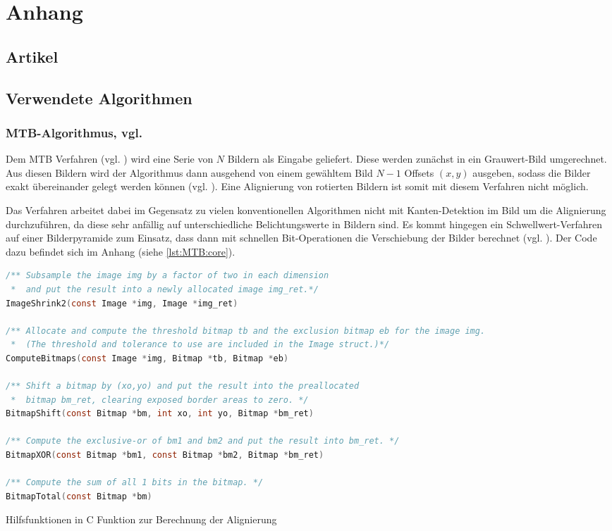 \chapter{Anhang}
\section{Artikel \cite{paper}}
 
\section{Verwendete Algorithmen}

\subsection{MTB-Algorithmus, vgl. \cite[S.9 f]{Ward03fast}}
\label{subsec:MTB}
Dem \gls{MTB} Verfahren (vgl. \cite{Ward03fast}) wird eine Serie von $N$ Bildern als Eingabe geliefert. Diese werden zunächst in ein Grauwert-Bild umgerechnet. Aus diesen Bildern wird der Algorithmus dann ausgehend von einem gewähltem Bild $N-1$ Offsets $(x,y)$ ausgeben, sodass die Bilder exakt übereinander gelegt werden können (vgl. \cite[S. 123f]{Reinhard}). Eine Alignierung von rotierten Bildern ist somit mit diesem Verfahren nicht möglich. 

Das Verfahren arbeitet dabei im Gegensatz zu vielen konventionellen Algorithmen nicht mit Kanten-Detektion im Bild um die Alignierung durchzuführen, da diese sehr anfällig auf unterschiedliche Belichtungswerte in Bildern sind. Es kommt hingegen ein Schwellwert-Verfahren auf einer Bilderpyramide zum Einsatz, dass dann mit schnellen Bit-Operationen die Verschiebung der Bilder berechnet (vgl. \cite{Ward03fast}). Der Code dazu befindet sich im Anhang (siehe \autoref{lst:MTB:core}).

\begin{Listing}[H]
\label{lst:MTB:helpers}
\begin{lstlisting}[language=c]
/** Subsample the image img by a factor of two in each dimension 
 *  and put the result into a newly allocated image img_ret.*/
ImageShrink2(const Image *img, Image *img_ret)

/** Allocate and compute the threshold bitmap tb and the exclusion bitmap eb for the image img. 
 *  (The threshold and tolerance to use are included in the Image struct.)*/
ComputeBitmaps(const Image *img, Bitmap *tb, Bitmap *eb)

/** Shift a bitmap by (xo,yo) and put the result into the preallocated 
 *  bitmap bm_ret, clearing exposed border areas to zero. */
BitmapShift(const Bitmap *bm, int xo, int yo, Bitmap *bm_ret)

/** Compute the exclusive-or of bm1 and bm2 and put the result into bm_ret. */
BitmapXOR(const Bitmap *bm1, const Bitmap *bm2, Bitmap *bm_ret)

/** Compute the sum of all 1 bits in the bitmap. */
BitmapTotal(const Bitmap *bm)
\end{lstlisting}
\caption{Hilfsfunktionen in C Funktion zur Berechnung der Alignierung}

\end{Listing}

